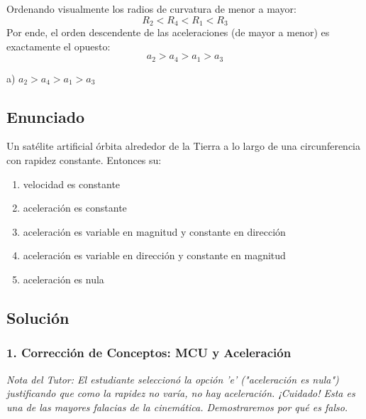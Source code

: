 \documentclass[12pt, a4paper]{article}
\begin{document}
Ordenando visualmente los radios de curvatura de menor a mayor:
$$ R_2 < R_4 < R_1 < R_3 $$
Por ende, el orden descendente de las aceleraciones (de mayor a menor) es exactamente el opuesto:
$$ a_2 > a_4 > a_1 > a_3 $$

\begin{tcolorbox}[colback=green!5!white, colframe=green!50!black, title=Respuesta Final]
\centering \Large a) $a_2 > a_4 > a_1 > a_3$
\end{tcolorbox}

\newpage

\subsection*{Enunciado}
Un satélite artificial órbita alrededor de la Tierra a lo largo de una circunferencia con rapidez constante. Entonces su:
\begin{enumerate}[label=\alph*)]
    \item velocidad es constante
    \item aceleración es constante
    \item aceleración es variable en magnitud y constante en dirección
    \item aceleración es variable en dirección y constante en magnitud
    \item aceleración es nula
\end{enumerate}

\subsection*{Solución}

\subsubsection*{1. Corrección de Conceptos: MCU y Aceleración}
\textit{Nota del Tutor: El estudiante seleccionó la opción 'e' ("aceleración es nula") justificando que como la rapidez no varía, no hay aceleración. ¡Cuidado! Esta es una de las mayores falacias de la cinemática. Demostraremos por qué es falso.}
\end{document}
